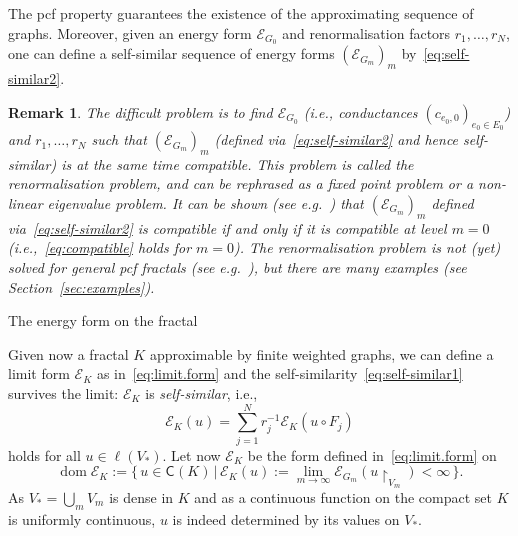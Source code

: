\documentclass[12pt,reqno,a4paper]{amsart}            %
\makeatletter
\numberwithin{equation}{section}
\newcommand{\myfont}{\sffamily}
\theoremstyle{mythmstyle}       %
\theoremstyle{mydefstyle}        %
\newtheorem{remark}[theorem]{Remark}
\renewcommand\subsection{\@startsection{subsection}{2}%
  \z@{-.5\linespacing\@plus-.7\linespacing}{.5\linespacing}%
  {\large\myfont\bfseries}}
\newcommand{\Sec}[1]{Section~\ref{sec:#1}}
\newcommand{\set}[2]{\{ \, #1 \, | \, #2 \, \} }      %
\newcommand{\restr}[1]{{\restriction}_{#1}} %
\DeclareMathOperator{\dom}    {dom}
\newcommand{\1}{\mathbbm 1}                    %
\newcommand{\Contsymb} {\mathsf C}     %
\newcommand{\lsymb}    {\ell}          %
\newcommand{\Contspace}[1][{}]{\Contsymb^{#1}}     %
\newcommand{\Cont}[2][{}]{\Contspace[#1]({#2})}
\newcommand{\pcf}{pcf\xspace}
\newcommand{\energy}{\mathcal E}
\newcommand{\conductance}{c}  %
\newcommand{\lspace}[1]{\lsymb({#1})}   %
\makeatother
\begin{document}
The \pcf property guarantees the existence of the approximating
sequence of graphs.  Moreover, given an energy form $\energy_{G_0}$
and renormalisation factors $r_1,\dots,r_N$, one can define a
self-similar sequence of energy forms $(\energy_{G_m})_m$
by~\eqref{eq:self-similar2}.

\begin{remark}
  \label{rem:renorm.prob}
  The difficult problem is to find $\energy_{G_0}$ (i.e., conductances
  $(\conductance_{e_0,0})_{e_0 \in E_0}$) and $r_1,\dots,r_N$ such
  that $(\energy_{G_m})_m$ (defined via~\eqref{eq:self-similar2} and
  hence self-similar) is at the same time \emph{compatible}.  This
  problem is called the \emph{renormalisation problem}, and can be
  rephrased as a fixed point problem or a non-linear eigenvalue
  problem.  It can be shown (see e.g.~\cite[Prop.~3.1.3]{kigami:01})
  that $(\energy_{G_m})_m$ defined via~\eqref{eq:self-similar2} is
  compatible if and only if it is compatible at level $m=0$
  (i.e.,~\eqref{eq:compatible} holds for $m=0$).  The renormalisation
  problem is not (yet) solved for general \pcf fractals (see
  e.g.~\cite[Sec.4.2, p.~98f]{strichartz:06}), but there are many
  examples (see \Sec{examples}).
\end{remark}

\subsection{The energy form on the fractal}

Given now a fractal $K$ approximable by finite weighted graphs, we can
define a limit form $\energy_K$ as in~\eqref{eq:limit.form} and the
self-similarity~\eqref{eq:self-similar1} survives the limit:
$\energy_K$ is \emph{self-similar}, i.e.,
\begin{equation}
  \label{eq:self-similar3}
  \energy_K(u)
  =\sum_{j=1}^N r_j^{-1} \energy_K(u\circ F_j)
\end{equation}
holds for all $u \in \lspace{V_*}$.  Let now $\energy_K$
be the form defined in~\eqref{eq:limit.form} on
\begin{equation*}
  \dom \energy_K
  := \set{u \in \Cont K}
  {\energy_K(u):=\lim_{m \to \infty} \energy_{G_m}(u \restr {V_m}) < \infty}.
\end{equation*}
As $V_*=\bigcup_m V_m$ is dense in $K$ and as a continuous function
on the compact set $K$ is uniformly continuous, $u$ is indeed determined
by its values on $V_*$.
\end{document}
